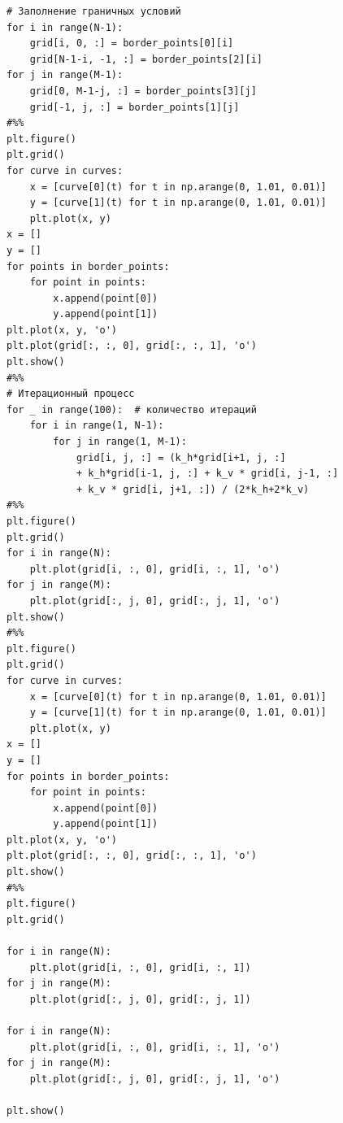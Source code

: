 \documentclass[a4paper,14pt,russian]{extreport}
\renewcommand{\_}{\kern-1.5pt\textunderscore\kern-1.5pt}
\begin{document}
\begin{verbatim}
# Заполнение граничных условий
for i in range(N-1):
    grid[i, 0, :] = border_points[0][i]
    grid[N-1-i, -1, :] = border_points[2][i]
for j in range(M-1):
    grid[0, M-1-j, :] = border_points[3][j]
    grid[-1, j, :] = border_points[1][j]
#%%
plt.figure()
plt.grid()
for curve in curves:
    x = [curve[0](t) for t in np.arange(0, 1.01, 0.01)]
    y = [curve[1](t) for t in np.arange(0, 1.01, 0.01)]
    plt.plot(x, y)
x = []
y = []
for points in border_points:
    for point in points:
        x.append(point[0])
        y.append(point[1])
plt.plot(x, y, 'o')
plt.plot(grid[:, :, 0], grid[:, :, 1], 'o')
plt.show()
#%%
# Итерационный процесс
for _ in range(100):  # количество итераций
    for i in range(1, N-1):
        for j in range(1, M-1):
            grid[i, j, :] = (k_h*grid[i+1, j, :]
            + k_h*grid[i-1, j, :] + k_v * grid[i, j-1, :]
            + k_v * grid[i, j+1, :]) / (2*k_h+2*k_v)
#%%
plt.figure()
plt.grid()
for i in range(N):
    plt.plot(grid[i, :, 0], grid[i, :, 1], 'o')
for j in range(M):
    plt.plot(grid[:, j, 0], grid[:, j, 1], 'o')
plt.show()
#%%
plt.figure()
plt.grid()
for curve in curves:
    x = [curve[0](t) for t in np.arange(0, 1.01, 0.01)]
    y = [curve[1](t) for t in np.arange(0, 1.01, 0.01)]
    plt.plot(x, y)
x = []
y = []
for points in border_points:
    for point in points:
        x.append(point[0])
        y.append(point[1])
plt.plot(x, y, 'o')
plt.plot(grid[:, :, 0], grid[:, :, 1], 'o')
plt.show()
#%%
plt.figure()
plt.grid()

for i in range(N):
    plt.plot(grid[i, :, 0], grid[i, :, 1])
for j in range(M):
    plt.plot(grid[:, j, 0], grid[:, j, 1])

for i in range(N):
    plt.plot(grid[i, :, 0], grid[i, :, 1], 'o')
for j in range(M):
    plt.plot(grid[:, j, 0], grid[:, j, 1], 'o')

plt.show()
\end{verbatim}
\end{document}
